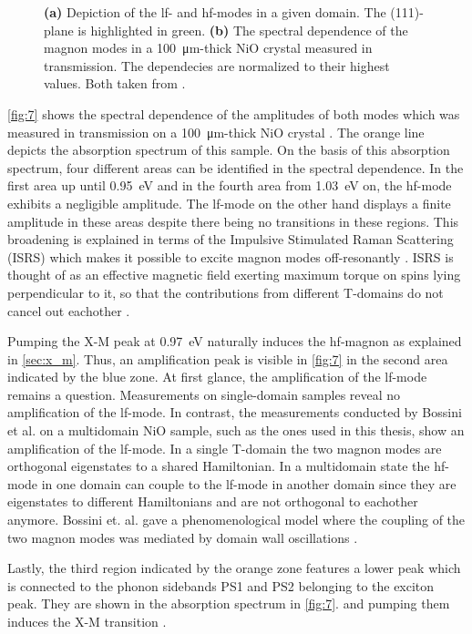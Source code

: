 \begin{figure}[htb!]
\begin{subfigure}[c]{0.5\textwidth}
        \caption{}
        \label{fig:7}
    \end{subfigure}
    \vspace{-0.3cm}
    \caption{\textbf{(a)} Depiction of the lf- and hf-modes in a given domain. The (111)-plane is highlighted in green. \textbf{(b)} The spectral dependence of the magnon modes in a \qty{100}{\um}-thick NiO crystal measured in transmission. The dependecies are normalized to their highest values. Both taken from \cite{bossini_ultrafast_2021}.}
\end{figure}
\FloatBarrier
\autoref{fig:7} shows the spectral dependence of the amplitudes of both modes which was measured in transmission on a \qty{100}{\um}-thick NiO crystal \cite{bossini_ultrafast_2021}.
The orange line depicts the absorption spectrum of this sample.
On the basis of this absorption spectrum, four different areas can be identified in the spectral dependence.
In the first area up until \qty{0.95}{eV} and in the fourth area from \qty{1.03}{eV} on, the hf-mode exhibits a negligible amplitude.
The lf-mode on the other hand displays a finite amplitude in these areas despite there being no transitions in these regions.
This broadening is explained in terms of the Impulsive Stimulated Raman Scattering (ISRS) \cite{tzschaschel_ultrafast_2017} which makes it possible to excite magnon modes off-resonantly \cite{bossini_controlling_2014}\cite{bossini_femtosecond_2017}.
ISRS is thought of as an effective magnetic field exerting maximum torque on spins lying perpendicular to it, so that the contributions from different T-domains do not cancel out eachother \cite{kirilyuk_ultrafast_2006}\cite{kirilyuk_ultrafast_2010}.

Pumping the X-M peak at \qty{0.97}{eV} naturally induces the hf-magnon as explained in \autoref{sec:x_m}.
Thus, an amplification peak is visible in \autoref{fig:7} in the second area indicated by the blue zone.
At first glance, the amplification of the lf-mode remains a question.
Measurements on single-domain samples reveal no amplification of the lf-mode.
In contrast, the measurements conducted by Bossini et al. on a multidomain NiO sample, such as the ones used in this thesis, show an amplification of the lf-mode.
In a single T-domain the two magnon modes are orthogonal eigenstates to a shared Hamiltonian.
In a multidomain state the hf-mode in one domain can couple to the lf-mode in another domain since they are eigenstates to different Hamiltonians and are not orthogonal to eachother anymore.
Bossini et. al. gave a phenomenological model where the coupling of the two magnon modes was mediated by domain wall oscillations \cite{bossini_ultrafast_2021}.

Lastly, the third region indicated by the orange zone features a lower peak which is connected to the phonon sidebands PS1 and PS2 belonging to the exciton peak.
They are shown in the absorption spectrum in \autoref{fig:7}. and pumping them induces the X-M transition \cite{bossini_ultrafast_2021}.